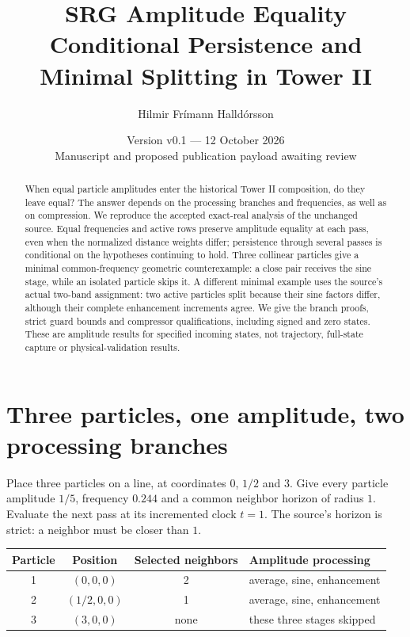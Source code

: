\documentclass[11pt,a4paper]{article}
\title{\textbf{SRG Amplitude Equality}\\[4pt]
\large Conditional Persistence and Minimal Splitting in Tower II}
\author{Hilmir Frímann Halldórsson}
\date{Version v0.1 --- 12 October 2026\\[3pt]\small Manuscript and proposed publication payload awaiting review}
\theoremstyle{definition}
\theoremstyle{remark}\newtheorem{remark}[theorem]{Remark}
\numberwithin{equation}{section}
\begin{document}
\maketitle
\begin{abstract}
When equal particle amplitudes enter the historical Tower II composition, do they leave equal?
The answer depends on the processing branches and frequencies, as well as on compression.
We reproduce the accepted exact-real analysis of the unchanged source.
Equal frequencies and active rows preserve amplitude equality at each pass, even when
the normalized distance weights differ; persistence through several passes is conditional
on the hypotheses continuing to hold. Three collinear particles give a minimal
common-frequency geometric counterexample: a close pair receives the sine stage,
while an isolated particle skips it. A different minimal example uses the source's actual
two-band assignment: two active particles split because their sine factors differ,
although their complete enhancement increments agree. We give the branch proofs,
strict guard bounds and compressor qualifications, including signed and zero states.
These are amplitude results for specified incoming states, not trajectory, full-state
capture or physical-validation results.
\end{abstract}

\section{Three particles, one amplitude, two processing branches}\label{sec:opening}
Place three particles on a line, at coordinates $0$, $1/2$ and $3$.
Give every particle amplitude $1/5$, frequency $0.244$ and a common neighbor horizon
of radius $1$. Evaluate the next pass at its incremented clock $t=1$.
The source's horizon is strict: a neighbor must be closer than $1$.

\begin{center}
\begin{tabular}{@{}cccl@{}}
\toprule Particle & Position & Selected neighbors & Amplitude processing\\
\midrule
1 & $(0,0,0)$ & 2 & average, sine, enhancement\\
2 & $(1/2,0,0)$ & 1 & average, sine, enhancement\\
3 & $(3,0,0)$ & none & these three stages skipped\\
\bottomrule
\end{tabular}
\end{center}
\end{document}
